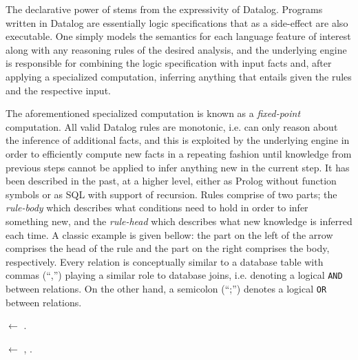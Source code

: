 The declarative power of \doop{} stems from the expressivity of Datalog. Programs written in Datalog are essentially logic specifications that as a side-effect are also executable. One simply models the semantics for each language feature of interest along with any reasoning rules of the desired analysis, and the underlying engine is responsible for combining the logic specification with input facts and, after applying a specialized computation, inferring anything that entails given the rules and the respective input.

The aforementioned specialized computation is known as a \emph{fixed-point} computation. All valid Datalog rules are monotonic, i.e. can only reason about the inference of additional facts, and this is exploited by the underlying engine in order to efficiently compute new facts in a repeating fashion until knowledge from previous steps cannot be applied to infer anything new in the current step. It has been described in the past, at a higher level, either as Prolog without function symbols or as SQL with support of recursion. Rules comprise of two parts; the \emph{rule-body} which describes what conditions need to hold in order to infer something new, and the \emph{rule-head} which describes what new knowledge is inferred each time. A classic example is given bellow: the part on the left of the arrow comprises the head of the rule and the part on the right comprises the body, respectively. Every relation is conceptually similar to a database table with commas (``,'') playing a similar role to database joins, i.e. denoting a logical \texttt{AND} between relations. On the other hand, a semicolon (``;'') denotes a logical \texttt{OR} between relations.





 $\leftarrow$ .

 $\leftarrow$ , .


